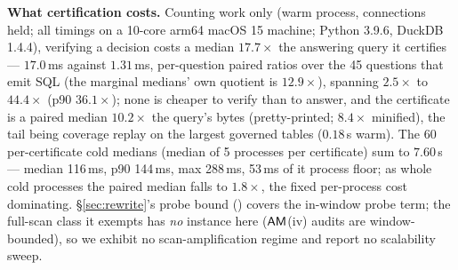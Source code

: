 \noindent{}\textbf{What certification costs.} Counting work only (warm
process, connections held; all timings on a 10-core arm64 macOS 15
machine; Python 3.9.6, DuckDB 1.4.4), verifying a decision costs a median
$17.7\times$ the answering query it certifies --- $17.0$\,ms against
$1.31$\,ms, per-question paired ratios over the 45 questions that emit SQL
(the marginal medians' own quotient is $12.9\times$), spanning $2.5\times$ to
$44.4\times$ (p90 $36.1\times$); none is cheaper to verify than to answer, and
the certificate is a paired median $10.2\times$ the query's bytes
(pretty-printed; $8.4\times$ minified), the tail
being coverage replay on the largest governed tables ($0.18$\,s warm). The 60
per-certificate cold
medians (median of 5 processes per certificate) sum to $7.60$\,s ---
median 116\,ms, p90 144\,ms, max 288\,ms, 53\,ms of it process floor; as whole
cold processes the paired median falls to $1.8\times$, the fixed per-process
cost dominating. \S\ref{sec:rewrite}'s probe bound (\cite{asofgov-tr}) covers the
in-window probe term; the full-scan class it exempts has \emph{no} instance
here ($\mathsf{AM}$(iv) audits are window-bounded), so we exhibit no
scan-amplification regime and report no scalability sweep.

